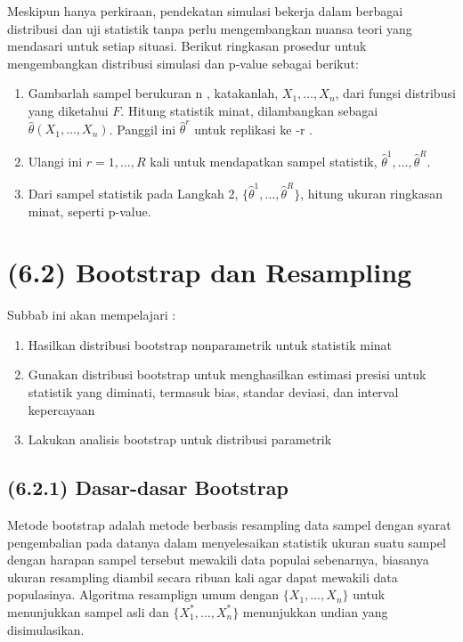 \documentclass[
]{book}
\begin{document}
Meskipun hanya perkiraan, pendekatan simulasi bekerja dalam berbagai distribusi dan uji statistik tanpa perlu mengembangkan nuansa teori yang mendasari untuk setiap situasi. Berikut ringkasan prosedur untuk mengembangkan distribusi simulasi dan p-value sebagai berikut:

\begin{enumerate}
\def\labelenumi{\arabic{enumi}.}
\item
  Gambarlah sampel berukuran n , katakanlah, \(X_1, \ldots, X_n\), dari fungsi distribusi yang diketahui \(F\). Hitung statistik minat, dilambangkan sebagai \(\hat{\theta}(X_1, \ldots, X_n)\). Panggil ini \(\hat{\theta}^r\) untuk replikasi ke -r .
\item
  Ulangi ini \(r=1, \ldots, R\) kali untuk mendapatkan sampel statistik, \(\hat{\theta}^1, \ldots,\hat{\theta}^R\).
\item
  Dari sampel statistik pada Langkah 2, \(\{\hat{\theta}^1, \ldots,\hat{\theta}^R\}\), hitung ukuran ringkasan minat, seperti p-value.
\end{enumerate}

\hypertarget{bootstrap-dan-resampling}{%
\section{(6.2) Bootstrap dan Resampling}\label{bootstrap-dan-resampling}}

Subbab ini akan mempelajari :

\begin{enumerate}
\def\labelenumi{\arabic{enumi}.}
\item
  Hasilkan distribusi bootstrap nonparametrik untuk statistik minat
\item
  Gunakan distribusi bootstrap untuk menghasilkan estimasi presisi untuk statistik yang diminati, termasuk bias, standar deviasi, dan interval kepercayaan
\item
  Lakukan analisis bootstrap untuk distribusi parametrik
\end{enumerate}

\hypertarget{dasar-dasar-bootstrap}{%
\subsection{(6.2.1) Dasar-dasar Bootstrap}\label{dasar-dasar-bootstrap}}

Metode bootstrap adalah metode berbasis resampling data sampel dengan syarat pengembalian pada datanya dalam menyelesaikan statistik ukuran suatu sampel dengan harapan sampel tersebut mewakili data populai sebenarnya, biasanya ukuran resampling diambil secara ribuan kali agar dapat mewakili data populasinya. Algoritma resamplign umum dengan \(\{X_1, \ldots, X_n\}\) untuk menunjukkan sampel asli dan \(\{X_1^*, \ldots, X_n^*\}\) menunjukkan undian yang disimulasikan.
\end{document}

